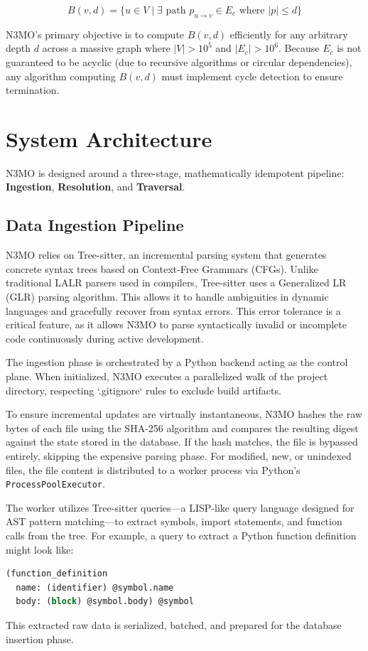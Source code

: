 \documentclass[conference]{IEEEtran}
\begin{document}
$$B(v, d) = \{ u \in V \mid \exists \text{ path } p_{u \to v} \in E_c \text{ where } |p| \le d \}$$

N3MO's primary objective is to compute $B(v, d)$ efficiently for any arbitrary depth $d$ across a massive graph where $|V| > 10^5$ and $|E_c| > 10^6$. Because $E_c$ is not guaranteed to be acyclic (due to recursive algorithms or circular dependencies), any algorithm computing $B(v, d)$ must implement cycle detection to ensure termination.

\section{System Architecture}

N3MO is designed around a three-stage, mathematically idempotent pipeline: \textbf{Ingestion}, \textbf{Resolution}, and \textbf{Traversal}. 

\subsection{Data Ingestion Pipeline}
N3MO relies on Tree-sitter, an incremental parsing system that generates concrete syntax trees based on Context-Free Grammars (CFGs). Unlike traditional LALR parsers used in compilers, Tree-sitter uses a Generalized LR (GLR) parsing algorithm. This allows it to handle ambiguities in dynamic languages and gracefully recover from syntax errors. This error tolerance is a critical feature, as it allows N3MO to parse syntactically invalid or incomplete code continuously during active development.

The ingestion phase is orchestrated by a Python backend acting as the control plane. When initialized, N3MO executes a parallelized walk of the project directory, respecting `.gitignore` rules to exclude build artifacts. 

To ensure incremental updates are virtually instantaneous, N3MO hashes the raw bytes of each file using the SHA-256 algorithm and compares the resulting digest against the state stored in the database. If the hash matches, the file is bypassed entirely, skipping the expensive parsing phase. For modified, new, or unindexed files, the file content is distributed to a worker process via Python's \texttt{ProcessPoolExecutor}.

The worker utilizes Tree-sitter queries—a LISP-like query language designed for AST pattern matching—to extract symbols, import statements, and function calls from the tree. For example, a query to extract a Python function definition might look like:
\begin{lstlisting}[language=Lisp, numbers=none]
(function_definition
  name: (identifier) @symbol.name
  body: (block) @symbol.body) @symbol
\end{lstlisting}
This extracted raw data is serialized, batched, and prepared for the database insertion phase.
\end{document}
